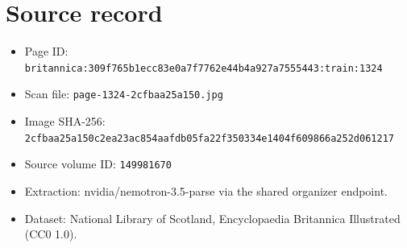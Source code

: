 \documentclass{article}
\begin{document}
\section*{Source record}
\begin{itemize}
\item Page ID: \texttt{britannica:309f765b1ecc83e0a7f7762e44b4a927a7555443:train:1324}
\item Scan file: \texttt{page-1324-2cfbaa25a150.jpg}
\item Image SHA-256: \texttt{2cfbaa25a150c2ea23ac854aafdb05fa22f350334e1404f609866a252d061217}
\item Source volume ID: \texttt{149981670}
\item Extraction: nvidia/nemotron-3.5-parse via the shared organizer endpoint.
\item Dataset: National Library of Scotland, Encyclopaedia Britannica Illustrated (CC0 1.0).
\end{itemize}
\end{document}
